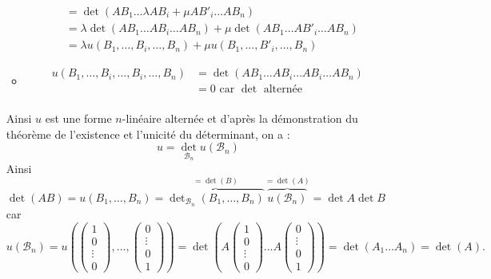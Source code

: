 \documentclass{book}
\begin{document}
\begin{Demonstration}
\begin{enumerate}
\begin{itemize}
$$\begin{aligned}
&=\det(AB_1\dots \lambda A B_i+ \mu A B'_i \dots  AB_n)\\
&=\lambda \det(AB_1\dots  A B_i \dots  AB_n)+\mu \det(AB_1\dots  A B'_i \dots  AB_n)\\
&=\lambda u(B_1,\dots,  B_i, \dots, B_n)+\mu u(B_1,\dots,   B'_i, \dots, B_n)
\end{aligned}
$$
\item {}
$$\begin{aligned}
u(B_1,\dots, B_i,\dots, B_i, \dots, B_n)&=\det(AB_1\dots A B_i\dots A B_i\dots  AB_n)\\
&=0 \text{ car }\det\text{ alternée}\\
\end{aligned}
$$
\end{itemize}
Ainsi $u$ est une forme $n$-linéaire alternée et d'après la démonstration du théorème de l'existence et l'unicité du déterminant, on a :
$$u=\det_{\mathcal{B}_n} u(\mathcal{B}_n)$$  
Ainsi $\det (AB)=u(B_1,\dots,B_n)=\overbrace{\det_{\mathcal{B}_n}(B_1,\dots,B_n)}^{=\det(B)}\overbrace{u(\mathcal{B}_n)}^{=\det(A)}=\det A \det B$  car
$$u(\mathcal{B}_n)=u(\begin{pmatrix}1\\0\\\vdots\\0\end{pmatrix},\dots,\begin{pmatrix}0\\\vdots\\0\\1\end{pmatrix})=\det(A\begin{pmatrix}1\\0\\\vdots\\0\end{pmatrix} \dots A\begin{pmatrix}0\\\vdots\\0\\1\end{pmatrix})=\det(A_1\dots A_n)=\det(A).$$


\end{enumerate}
\end{Demonstration}
\end{document}

